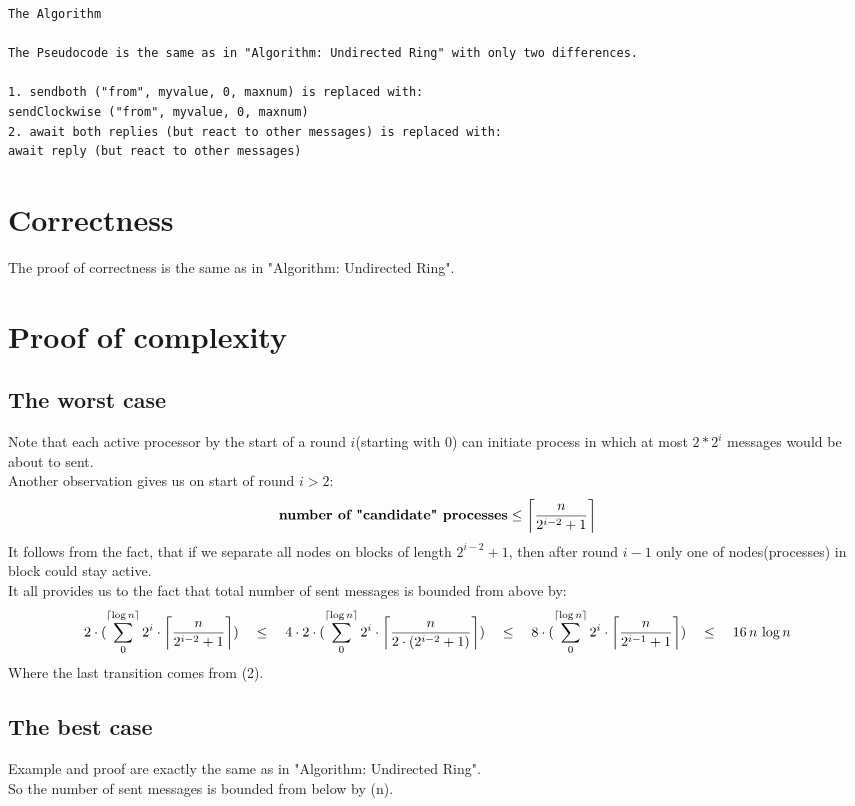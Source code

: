 \documentclass{article}
\DeclarePairedDelimiter\ceil{\lceil}{\rceil}
\begin{document}
\begin{lstlisting}
The Algorithm

The Pseudocode is the same as in "Algorithm: Undirected Ring" with only two differences.

1. sendboth ("from", myvalue, 0, maxnum) is replaced with:
sendClockwise ("from", myvalue, 0, maxnum)
2. await both replies (but react to other messages) is replaced with:
await reply (but react to other messages)

\end{lstlisting}

\section*{Correctness}
The proof of correctness is the same as in "Algorithm: Undirected Ring".


\section*{Proof of complexity}
\subsection*{The worst case}
   Note that each active processor by the start of a round $i$(starting with 0) can initiate process in which at most $2*2^i$ messages would be about to sent. \\
   Another observation gives us on start of round $i > 2$:
   \begin{equation}
   \textbf{number of "candidate" processes} \leq \ceil*{\frac{n}{2^{i-2} + 1}}
   \end{equation}
   It follows from the fact, that if we separate all nodes on blocks of length $2^{i-2} + 1$, then after round $i-1$ only one of nodes(processes) in block could stay active.\\


   \bigskip
   \noindent
   It all provides us to the fact that total number of sent messages is bounded from above by:
   \begin{equation}
   2\cdot(\sum_0^{\ceil*{\log n}} 2^i \cdot \ceil*{\frac{n}{2^{i-2} + 1}})
   \quad \leq \quad
   4\cdot2\cdot(\sum_0^{\ceil*{\log n}} 2^i \cdot \ceil*{\frac{n}{2 \cdot(2^{i-2} + 1)}})
   \quad\leq\quad
   8\cdot(\sum_0^{\ceil*{\log n}} 2^i \cdot \ceil*{\frac{n}{2^{i-1} + 1}})
   \quad\leq\quad
   16\, n \,\log n
   \end{equation}
   Where the last transition comes from (2).
  \subsection*{The best case}
    Example and proof are exactly the same as in "Algorithm: Undirected Ring".\\
    So the number of sent messages is bounded from below by (n).
\bigskip
\end{document}
